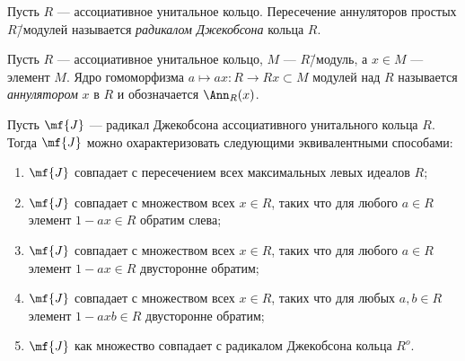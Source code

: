 \documentclass[
	extrafontsizes,
	11pt,
	hyphens,
]{memoir}
\begin{document}
\begin{definition}
Пусть \(R\) --- ассоциативное унитальное кольцо.
Пересечение аннуляторов простых \(R\)\=/модулей называется \emph{радикалом Джекобсона} кольца \(R\).
\end{definition}

\begin{definition}
Пусть \(R\) --- ассоциативное унитальное кольцо, \(M\) --- \(R\)\=/модуль, а \(x \in M\) --- элемент \(M\).
Ядро гомоморфизма \(a \mapsto ax : R \to Rx \subset M\) модулей над \(R\) называется \emph{аннулятором} \(x\) в \(R\) и обозначается \(\Ann_R(x)\).
\end{definition}

\begin{theorem}
Пусть \(\mf{J}\) --- радикал Джекобсона ассоциативного унитального кольца \(R\). Тогда \(\mf{J}\) можно охарактеризовать следующими эквивалентными способами:
\begin{enumerate}[
	font=\upshape,
	label=\asbuk*),
	ref=\asbuk*,
	]
\item \label{itm:Jacobson1}
\(\mf{J}\) совпадает с пересечением всех максимальных левых идеалов \(R\);

\item \label{itm:Jacobson2}
\(\mf{J}\) совпадает с множеством всех \(x \in R\), таких что для любого \(a \in R\) элемент \(1 - ax \in R\) обратим слева;

\item \label{itm:Jacobson3}
\(\mf{J}\) совпадает с множеством всех \(x \in R\), таких что для любого \(a \in R\) элемент \(1 - ax \in R\) двусторонне обратим;

\item \label{itm:Jacobson4}
\(\mf{J}\) совпадает с множеством всех \(x \in R\), таких что для любых \(a, b \in R\) элемент \(1 - axb \in R\) двусторонне обратим;

\item \label{itm:Jacobson5}
\(\mf{J}\) как множество совпадает с радикалом Джекобсона кольца \(R^o\).
\end{enumerate}
\end{theorem}
\end{document}
